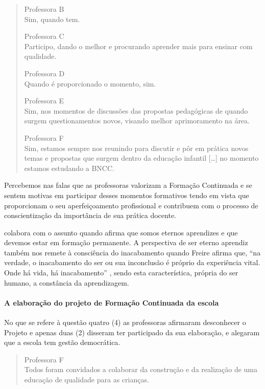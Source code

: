 \begin{refsection}
\begin{quotation}
        \negpar[-1.5em]{}Professora B\quad{}\\Sim, quando tem. 
        \medskip

        \negpar[-1.5em]{}Professora C\quad{}\\Participo, dando o melhor e procurando aprender mais para ensinar com qualidade. 
        \medskip

        \negpar[-1.5em]{}Professora D\quad{}\\Quando é proporcionado o momento, sim. 
        \medskip

        \negpar[-1.5em]{}Professora E\quad{}\\Sim, nos momentos de discussões das propostas pedagógicas de quando surgem questionamentos novos, visando melhor aprimoramento na área. 
        \medskip

        \negpar[-1.5em]{}Professora F\quad{}\\Sim, estamos sempre nos reunindo para discutir e pôr em prática novos temas e propostas que surgem dentro da educação infantil [\dots] no momento estamos estudando a BNCC. 
    \end{quotation}
    

    Percebemos nas falas que as professoras valorizam a Formação Continuada e se sentem motivas em participar desses momentos formativos tendo em vista que proporcionam o seu aperfeiçoamento profissional e contribuem com o processo de conscientização da importância de sua prática docente. 

    \textcite{FREIRE1996Pedagogia} colabora com o assunto quando afirma que somos eternos aprendizes e que devemos estar em formação permanente. A perspectiva de ser eterno aprendiz também nos remete à consciência do inacabamento quando Freire afirma que, “na verdade, o inacabamento do ser ou sua inconclusão é próprio da experiência vital. Onde há vida, há inacabamento” \cite[p.~50]{FREIRE1996Pedagogia}, sendo esta característica, própria do ser humano, a constância da aprendizagem. 

    \paragraph{A elaboração do projeto de Formação Continuada da escola} No que se refere à questão quatro (4) as professoras afirmaram desconhecer o Projeto e apenas duas (2) disseram ter participado da sua elaboração, e alegaram que a escola tem gestão democrática.  

    \begin{quotation}
        \noindent\negpar[-1.5em]{}Professora F\quad{}\\Todos foram convidados a colaborar da construção e da realização de uma educação de qualidade para as crianças.  
        \medskip
    

\end{quotation}
\end{refsection}
